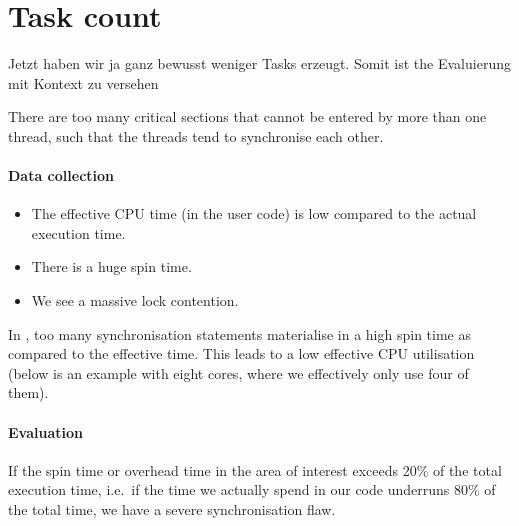 \section{Task count}
\label{section:node-level:task-count}



Jetzt haben wir ja ganz bewusst weniger Tasks erzeugt. 
Somit ist the Evaluierung mit Kontext zu versehen

\begin{hypothesis}
 There are too many critical sections that cannot be entered by more than one thread, such that the threads tend to synchronise each other.
\end{hypothesis}


\paragraph{Data collection}

\begin{itemize}
  \item The effective CPU time (in the user code) is low compared to the actual execution time.
  \item There is a huge spin time.
  \item We see a massive lock contention.
\end{itemize}

\noindent

\begin{instructions}{\vtune}
In \vtune, too many synchronisation statements materialise in a high spin time as compared to the effective time.  
This leads to a low effective CPU utilisation (below is an example with eight cores, where we effectively only use four of them).
\end{instructions}


\paragraph{Evaluation}

If the spin time or overhead time in the area of interest exceeds 20\% of the total execution time, i.e.~if the time we actually spend in our code underruns 80\% of the total time, we have a severe synchronisation flaw.


